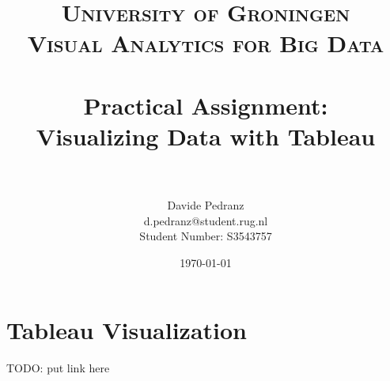 \documentclass[paper=a4, fontsize=11pt]{scrartcl}
\title{	
    \normalfont
    \large \textsc{University of Groningen \\ Visual Analytics for Big Data} \\ [22pt]
    \horrule{0.5pt} \\[0.4cm]
    \huge Practical Assignment: \\ Visualizing Data with Tableau \\
    \horrule{0.5pt} \\[0.5cm]
}
\author{
    Davide Pedranz \\
    \small d.pedranz@student.rug.nl \\
    \small Student Number: S3543757    
}
\date{\vspace{0.5cm} \normalsize\today}
\numberwithin{equation}{section} %
\numberwithin{figure}{section} %
\numberwithin{table}{section} %
\begin{document}
\maketitle

\tableofcontents

\section*{Tableau Visualization}
TODO: put link here

\clearpage







% 
% 
\end{document}

